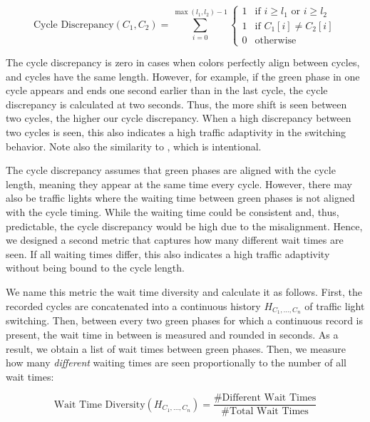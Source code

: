 \begin{equation} \text{Cycle Discrepancy}(C_1, C_2) =  \sum_{i=0}^{\max(l_1, l_2)-1} \left\{
\begin{array}{ll}
1 & \text{if } i \geq l_1 \text{ or } i \geq l_2 \\
1 & \text{if } C_1[i] \neq C_2[i] \\
0 & \text{otherwise}
\end{array} \right.\end{equation}

The cycle discrepancy is zero in cases when colors perfectly align between cycles, and cycles have the same length. However, for example, if the green phase in one cycle appears and ends one second earlier than in the last cycle, the cycle discrepancy is calculated at two seconds. Thus, the more shift is seen between two cycles, the higher our cycle discrepancy. When a high discrepancy between two cycles is seen, this also indicates a high traffic adaptivity in the switching behavior. Note also the similarity to , which is intentional.

The cycle discrepancy assumes that green phases are aligned with the cycle length, meaning they appear at the same time every cycle. However, there may also be traffic lights where the waiting time between green phases is not aligned with the cycle timing. While the waiting time could be consistent and, thus, predictable, the cycle discrepancy would be high due to the misalignment. Hence, we designed a second metric that captures how many different wait times are seen. If all waiting times differ, this also indicates a high traffic adaptivity without being bound to the cycle length.

We name this metric the wait time diversity and calculate it as follows. First, the recorded cycles are concatenated into a continuous history $H_{C_1, \dots, C_n}$ of traffic light switching. Then, between every two green phases for which a continuous record is present, the wait time in between is measured and rounded in seconds. As a result, we obtain a list of wait times between green phases. Then, we measure how many \textit{different} waiting times are seen proportionally to the number of all wait times:

\begin{equation}
\text{Wait Time Diversity}(H_{C_1, \dots, C_n}) = \frac{\text{\# Different Wait Times}}{\text{\# Total Wait Times}}
\end{equation}

